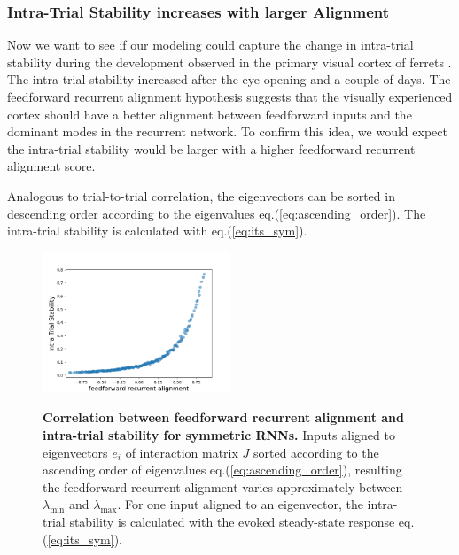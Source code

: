 \documentclass[11pt]{article}
\begin{document}
	
	\subsubsection{Intra-Trial Stability increases with larger Alignment}
	
	Now we want to see if our modeling could capture the change in intra-trial stability during the development observed in the primary visual cortex of ferrets \cite{tragenap2023nature}. The intra-trial stability increased after the eye-opening and a couple of days. The feedforward recurrent alignment hypothesis suggests that the visually experienced cortex should have a better alignment between feedforward inputs and the dominant modes in the recurrent network. To confirm this idea, we would expect the intra-trial stability would be larger with a higher feedforward recurrent alignment score. 
	
	Analogous to trial-to-trial correlation, the eigenvectors can be sorted in descending order according to the eigenvalues eq.(\ref{eq:ascending_order}). The intra-trial stability is calculated with eq.(\ref{eq:its_sym}).

	\begin{figure} 
		\centering
		\caption{\textbf{Correlation between feedforward recurrent alignment and intra-trial stability for symmetric RNNs.} Inputs aligned to eigenvectors $e_i$ of interaction matrix $J$ sorted according to the ascending order of eigenvalues eq.(\ref{eq:ascending_order}), resulting the feedforward recurrent alignment varies approximately between $\lambda_{\text{min}}$ and $\lambda_{\text{max}}$. For one input aligned to an eigenvector, the intra-trial stability is calculated with the evoked steady-state response eq.(\ref{eq:its_sym}).}
		\includegraphics[width=0.5\textwidth]{../figures/its_sym.png}
		\label{fig:its_ffrec_sym}
	\end{figure}
\end{document}
